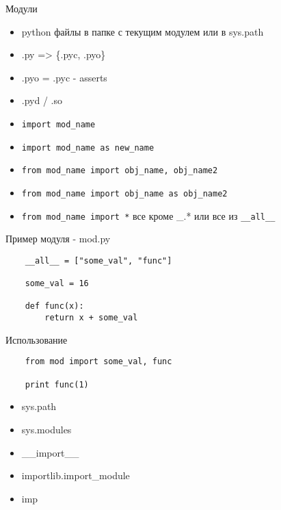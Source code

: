 \documentclass{article}
\begin{document}
\LARGE

\begin{center} Модули \end{center}
\begin{itemize}
	\item python файлы в папке с текущим модулем или в sys.path
	\item .py => \{.pyc, .pyo\}
	\item .pyo = .pyc - asserts
	\item .pyd / .so
	\item \lstinline!import mod_name!
	\item \lstinline!import mod_name as new_name!
	\item \lstinline!from mod_name import obj_name, obj_name2!
	\item \lstinline!from mod_name import obj_name as obj_name2!
	\item \lstinline!from mod_name import *! все кроме \_.* или все из \lstinline!__all__!
\end{itemize}
\newpage

\begin{center} Пример модуля - mod.py \end{center}
\begin{lstlisting}
	__all__ = ["some_val", "func"]
	
	some_val = 16

	def func(x):
		return x + some_val
\end{lstlisting}

\begin{center} Использование \end{center}
\begin{lstlisting}
	from mod import some_val, func

	print func(1)
\end{lstlisting}
\newpage

\begin{itemize}
	\item sys.path
	\item sys.modules
	\item \_\_import\_\_
	\item importlib.import\_module
	\item imp
\end{itemize}
\newpage
\end{document}

